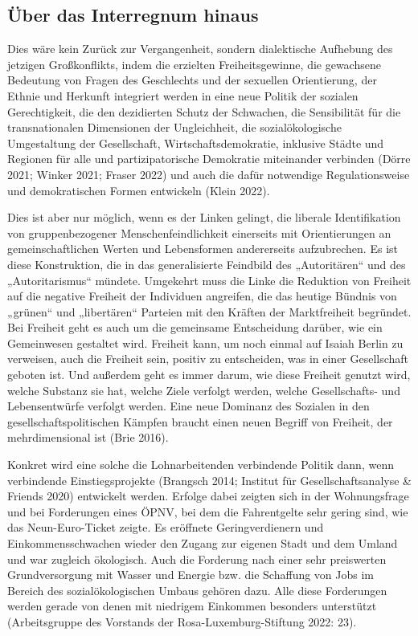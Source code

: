 \begin{multicols*}{2}
\section{Über das Interregnum hinaus}

\noindent Dies wäre kein Zurück zur Vergangenheit, sondern dialektische Aufhebung des jetzigen Großkonflikts, indem die erzielten Freiheitsgewinne, die gewachsene Bedeutung von Fragen des Geschlechts und der sexuellen Orientierung, der Ethnie und Herkunft integriert werden in eine neue Politik der sozialen Gerechtigkeit, die den dezidierten Schutz der Schwachen, die Sensibilität für die transnationalen Dimensionen der Ungleichheit, die sozialökologische Umgestaltung der Gesellschaft, Wirtschaftsdemokratie, inklusive Städte und Regionen für alle und partizipatorische Demokratie miteinander verbinden (Dörre 2021; Winker 2021; Fraser 2022) und auch die dafür notwendige Regulationsweise und demokratischen Formen entwickeln (Klein 2022).

Dies ist aber nur möglich, wenn es der Linken gelingt, die liberale Identifikation von gruppenbezogener Menschenfeindlichkeit einerseits mit Orientierungen an gemeinschaftlichen Werten und Lebensformen andererseits aufzubrechen. Es ist diese Konstruktion, die in das generalisierte Feindbild des „Autoritären“ und des „Autoritarismus“ mündete. Umgekehrt muss die Linke die Reduktion von Freiheit auf die negative Freiheit der Individuen angreifen, die das heutige Bündnis von „grünen“ und „libertären“ Parteien mit den Kräften der Marktfreiheit begründet. Bei Freiheit geht es auch um die gemeinsame Entscheidung darüber, wie ein Gemeinwesen gestaltet wird. Freiheit kann, um noch einmal auf Isaiah Berlin zu verweisen, auch die Freiheit sein, positiv zu entscheiden, was in einer Gesellschaft geboten ist. Und außerdem geht es immer darum, wie diese Freiheit genutzt wird, welche Substanz sie hat, welche Ziele verfolgt werden, welche Gesellschafts- und Lebensentwürfe verfolgt werden. Eine neue Dominanz des Sozialen in den gesellschaftspolitischen Kämpfen braucht einen neuen Begriff von Freiheit, der mehrdimensional ist (Brie 2016).

Konkret wird eine solche die Lohnarbeitenden verbindende Politik dann, wenn verbindende Einstiegsprojekte (Brangsch 2014; Institut für Gesellschaftsanalyse \& Friends 2020) entwickelt werden. Erfolge dabei zeigten sich in der Wohnungsfrage und bei Forderungen eines ÖPNV, bei dem die Fahrentgelte sehr gering sind, wie das Neun-Euro-Ticket zeigte. Es eröffnete Geringverdienern und Einkommensschwachen wieder den Zugang zur eigenen Stadt und dem Umland und war zugleich ökologisch. Auch die Forderung nach einer sehr preiswerten Grundversorgung mit Wasser und Energie bzw. die Schaffung von Jobs im Bereich des sozialökologischen Umbaus gehören dazu. Alle diese Forderungen werden gerade von denen mit niedrigem Einkommen besonders unterstützt (Arbeitsgruppe des Vorstands der Rosa-Luxemburg-Stiftung 2022: 23).


\end{multicols*}
